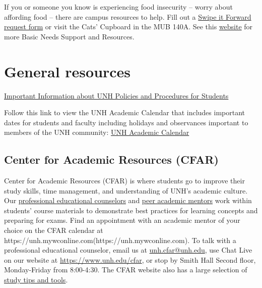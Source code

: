 \documentclass[
  letterpaper,
  DIV=11,
  numbers=noendperiod]{scrreprt}
\begin{document}
If you or someone you know is experiencing food insecurity -- worry
about affording food -- there are campus resources to help. Fill out a
\href{https://cm.maxient.com/reportingform.php?UnivofNH\&layout_id=15}{Swipe
it Forward request form} or visit the Cats' Cupboard in the MUB 140A.
See this
\href{https://www.unh.edu/dean-of-students/getting-help/housing-food-financial-basic-needs-support}{website}
for more Basic Needs Support and Resources.

\hypertarget{general-resources}{%
\section*{General resources}\label{general-resources}}


\href{https://td.unh.edu/TDClient/60/Portal/KB/ArticleDet?ID=1368}{Important
Information about UNH Policies and Procedures for Students}

Follow this link to view the UNH Academic Calendar that includes
important dates for students and faculty including holidays and
observances important to members of the UNH community:
\href{https://calendar.unh.edu//MasterCalendar.aspx?data=f1bM4GJyEC7OAZpRGWNxSrbbl6srt42DbygweOCcQCqXBA2URBJ7CdAOl8d5H3633QULXnJ\%2faAyyr\%2b0jnNFEvyvAYm9vn8bVYbr\%2fGq1YY\%2fvt\%2f6p2cwrqcxdBIjjKw8NKEKDCfXgh49P2\%2fDKyCjbzmm2DUp3AZkcy47t9pGdy2WMAMSzjLHAq7ZTMUfF67KnmQhLAc4DhDAEdHOkT935E6wO\%2fL4IhRpjd}{UNH
Academic Calendar}

\hypertarget{center-for-academic-resources-cfar}{%
\subsection*{Center for Academic Resources
(CFAR)}\label{center-for-academic-resources-cfar}}

Center for Academic Resources (CFAR) is where students go to improve
their study skills, time management, and understanding of UNH's academic
culture. Our
\href{https://www.unh.edu/student-success/center-academic-resources/meet-staff}{professional
educational counselors} and
\href{https://www.unh.edu/student-success/center-academic-resources/resources/working-academic-mentor}{peer
academic mentors} work within students' course materials to demonstrate
best practices for learning concepts and preparing for exams. Find an
appointment with an academic mentor of your choice on the CFAR calendar
at https://unh.mywconline.com(https://unh.mywconline.com). To talk with
a professional educational counselor, email us at
\url{unh.cfar@unh.edu}, use Chat Live on our website at
\url{https://www.unh.edu/cfar}, or stop by Smith Hall Second floor,
Monday-Friday from 8:00-4:30. The CFAR website also has a large
selection of
\href{https://www.unh.edu/student-success/center-academic-resources}{study
tips and tools}.
\end{document}
